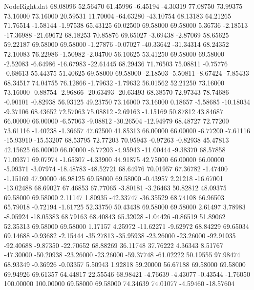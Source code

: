 \begin{filecontents}{NodeRight.dat}
  68.08096   52.56470   61.45996    -6.45194   -4.30319   77.08750   73.99375   73.16000   73.16000   20.59531   11.70004  -64.63280  -43.10754
  68.13183   64.21265   71.76514    -1.58144   -1.97538   65.43125   60.02500   69.58000   69.58000    5.36736   -2.18513  -17.36988  -21.69672
  68.18253   70.85876   69.65027    -3.69438   -2.87069   58.65625   59.22187   69.58000   69.58000   -1.27876   -0.07027  -40.33642  -31.34314
  68.24352   72.10083   76.22986    -1.50982   -2.04700   56.10625   53.41250   69.58000   69.58000   -2.52083   -6.64986  -16.67983  -22.61445
  68.29436   71.76503   75.08811    -0.75776   -0.68613   55.44375   51.40625   69.58000   69.58000   -2.18503   -5.50811   -8.67424   -7.85433
  68.34517   74.04755   76.12866    -1.79632   -1.79632   56.01562   52.21250   73.16000   73.16000   -0.88754   -2.96866  -20.63493  -20.63493
  68.38570   72.97343   78.74686    -0.90101   -0.82938   56.93125   49.23750   73.16000   73.16000    0.18657   -5.58685  -10.18034   -9.37106
  68.43652   72.57063   75.08812    -2.69163   -1.15169   50.87812   43.84687   66.00000   66.00000   -6.57063   -9.08812  -30.26504  -12.94979
  68.48727   72.77200   73.61116    -1.40238   -1.36657   47.62500   41.85313   66.00000   66.00000   -6.77200   -7.61116  -15.93910  -15.53207
  68.53795   72.77203   70.95943    -0.97263   -0.82938   45.47813   42.15625   66.00000   66.00000   -6.77203   -4.95943  -11.00444   -9.38370
  68.57858   71.09371   69.07974    -1.65307   -4.33900   44.91875   42.75000   66.00000   66.00000   -5.09371   -3.07974  -18.48783  -48.52721
  68.64976   70.01957   67.36782    -1.47400   -1.15169   47.90000   46.98125   69.58000   69.58000   -0.43957    2.21218  -16.67001  -13.02488
  68.69027   67.46853   67.77065    -3.80181   -3.26463   50.82812   48.09375   69.58000   69.58000    2.11147    1.80935  -42.33747  -36.35529
  68.74108   66.96503   65.79018    -0.72194   -1.61725   52.33750   50.43438   69.58000   69.58000    2.61497    3.78983   -8.05924  -18.05383
  68.79163   68.40843   65.32028    -1.04426   -0.86519   51.89062   52.35313   69.58000   69.58000    1.17157    4.25972  -11.62271   -9.62972
  68.84229   69.65034   69.14688    -0.93682   -2.15444  -35.27813  -35.95938  -23.26000  -23.26000  -92.91035  -92.40688   -9.87350  -22.70652
  68.88269   36.11748   37.76222     4.36343    8.51767  -47.30000  -50.20938  -23.26000  -23.26000  -59.37748  -61.02222   50.19555   97.98474
  68.93349   -0.36926   -0.03357     5.50943    1.92818   59.20000   56.67188   69.58000   69.58000   69.94926   69.61357   64.44817   22.55546
  68.98421   -4.76639   -4.43077    -0.43544   -1.76050  100.00000  100.00000   69.58000   69.58000   74.34639   74.01077   -4.59460  -18.57604

\end{filecontents}
